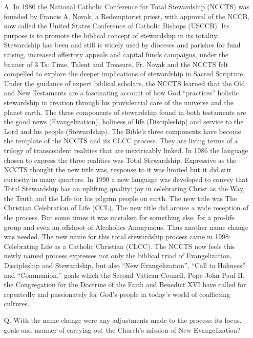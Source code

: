 \documentclass[oneside]{book}
\begin{document}
A. In 1980 the National Catholic Conference for Total Stewardship (NCCTS) was
founded by Francis A. Novak, a Redemptorist priest, with approval of the NCCB,
now called the United States Conference of Catholic Bishops (USCCB). Its purpose
is to promote the biblical concept of stewardship in its totality. Stewardship
has been and still is widely used by dioceses and parishes for fund raising,
increased offertory appeals and capital funds campaigns, under the banner of 3
Ts: Time, Talent and Treasure.
Fr. Novak and the NCCTS felt compelled to explore the deeper implications of
stewardship in Sacred Scripture. Under the guidance of expert biblical scholars,
the NCCTS learned that the Old and New Testaments are a fascinating account of
how God ``practices'' holistic stewardship in creation through his providential
care of the universe and the planet earth. The three components of stewardship
found in both testaments are the good news (Evangelization), holiness of life
(Discipleship) and service to the Lord and his people (Stewardship). The Bible's
three components have become the template of the NCCTS and its CLCC
process. They are living terms of a trilogy of transcendent realities that are
inextricably linked. In 1986 the language chosen to express the three realities
was Total Stewardship.
Expressive as the NCCTS thought the new title was, response to it was limited
but it did stir curiosity in many quarters. In 1990 a new language was developed
to convey that Total Stewardship has an uplifting quality: joy in celebrating
Christ as the Way, the Truth and the Life for his pilgrim people on earth. The
new title was The Christian Celebration of Life (CCL). The new title did arouse
a wide reception of the process. But some times it was mistaken for something
else, for a pro-life group and even an offshoot of Alcoholics Anonymous. Thus
another name change was needed.
The new name for this total stewardship process came in 1998: Celebrating Life
as a Catholic Christian (CLCC). The NCCTS now feels this newly named process
expresses not only the biblical triad of Evangelization, Discipleship and
Stewardship, but also ``New Evangelization'', ``Call to Holiness'' and
``Communion,'' goals which the Second Vatican Council, Pope John Paul II, the
Congregation for the Doctrine of the Faith and Benedict XVI have called for
repeatedly and passionately for God's people in today's world of conflicting
cultures.

Q. With the name change were any adjustments made to the process: its focus,
goals and manner of carrying out the Church's mission of New Evangelization?
\end{document}
